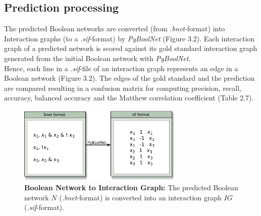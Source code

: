 
\subsection*{Prediction processing}

The predicted Boolean networks are converted (from \textit{.bnet}-format) into Interaction graphs (to a \textit{.sif}-format) by \textit{PyBoolNet} (Figure 3.2). Each interaction graph of a predicted network is scored against its gold standard interaction graph generated from the initial Boolean network with \textit{PyBoolNet}.\\
Hence, each line in a \textit{.sif}-file of an interaction graph represents an edge in a Boolean network (Figure 3.2). The edges of the gold standard and the prediction are compared resulting in a confusion matrix for computing precision, recall, accuracy, balanced accuracy and the Matthew correlation coefficient (Table 2.7).

\begin{figure}[H]
\centering
\includegraphics[width=0.7\textwidth]{./Bilder/bnet2sif.pdf}
\caption[Boolean Network to Interaction Graph]{\textbf{Boolean Network to Interaction Graph:} The predicted Boolean network $N$ (\textit{.bnet}-format) is converted into an interaction graph $IG$ (\textit{.sif}-format).}
\label{fig:9}
\end{figure}

 

